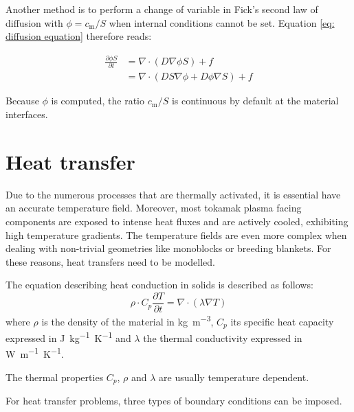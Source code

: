 Another method is to perform a change of variable in Fick's second law of diffusion with $\phi = c_\mathrm{m}/S$  when internal conditions cannot be set.
Equation \ref{eq: diffusion equation} therefore reads:

\begin{align}
    \frac{\partial \phi S}{\partial t} &= \nabla \cdot\left(D \nabla \phi S\right) + f \nonumber \\
    &=\nabla \cdot\left( D S \nabla \phi + D \phi \nabla S\right) + f \label{eq: diffusion equation changed}
\end{align}

Because $\phi$ is computed, the ratio $c_\mathrm{m}/S$ is continuous by default at the material interfaces.



\section{Heat transfer}
Due to the numerous processes that are thermally activated, it is essential have an accurate temperature field.
Moreover, most tokamak plasma facing components are exposed to intense heat fluxes and are actively cooled, exhibiting high temperature gradients.
The temperature fields are even more complex when dealing with non-trivial geometries like monoblocks or breeding blankets.
For these reasons, heat transfers need to be modelled.

The equation describing heat conduction in solids is described as follows:
\begin{equation}
    \rho \cdot C_p \frac{\partial T}{\partial t}=\nabla \cdot (\lambda \nabla T)
    \label{eq:heat equation}
\end{equation}
where $\rho$ is the density of the material in \si{kg.m^{-3}}, $C_p$ its specific heat capacity expressed in \si{J.kg^{-1}.K^{-1}} and $\lambda$ the thermal conductivity expressed in \si{W.m^{-1}.K^{-1}}.

The thermal properties $C_p$, $\rho$ and $\lambda$ are usually temperature dependent.

For heat transfer problems, three types of boundary conditions can be imposed.

